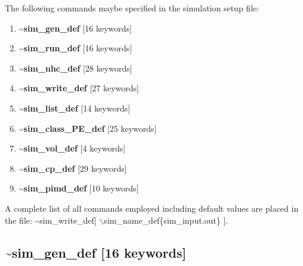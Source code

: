 \documentclass[12pt,titlepage]{article}
\begin{document}
The following commands maybe specified in the simulation setup file:
\begin{enumerate}
\item {\bf \~{}sim\_gen\_def} [16 keywords]
\item {\bf \~{}sim\_run\_def} [16 keywords]
\item {\bf \~{}sim\_nhc\_def} [28 keywords]
\item {\bf \~{}sim\_write\_def} [27 keywords]
\item {\bf \~{}sim\_list\_def} [14 keywords]
\item {\bf \~{}sim\_class\_PE\_def} [25 keywords]
\item {\bf \~{}sim\_vol\_def} [4 keywords]
\item {\bf \~{}sim\_cp\_def} [29 keywords]
\item {\bf \~{}sim\_pimd\_def} [10 keywords]
\end{enumerate}
A complete list of all commands employed including default
values are placed in the file:
\~{}sim\_write\_def[ $\backslash$sim\_name\_def\{sim\_input.out\} ]. 


\newpage
\subsection*{\bf \~{}sim\_gen\_def [16 keywords]}
\end{document}
